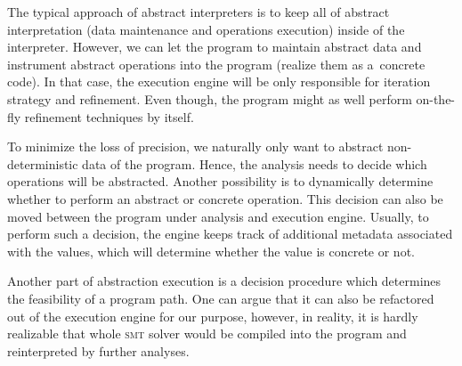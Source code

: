 The typical approach of abstract interpreters is to keep all of abstract
interpretation (data maintenance and operations execution) inside of the
interpreter. However, we can let the program to maintain abstract data and
instrument abstract operations into the program (realize them as a~concrete
code). In that case, the execution engine will be only responsible for iteration
strategy and refinement. Even though, the program might as well perform
on-the-fly refinement techniques by itself.

To minimize the loss of precision, we naturally only want to abstract
non-deterministic data of the program. Hence, the analysis needs to decide which
operations will be abstracted. Another possibility is to dynamically determine
whether to perform an abstract or concrete operation. This decision can also be
moved between the program under analysis and execution engine. Usually, to
perform such a decision, the engine keeps track of additional metadata
associated with the values, which will determine whether the value is concrete
or not.

Another part of abstraction execution is a decision procedure which determines
the feasibility of a program path. One can argue that it can also be refactored
out of the execution engine for our purpose, however, in reality, it is hardly
realizable that whole \textsc{smt} solver would be compiled into the program and
reinterpreted by further analyses.

